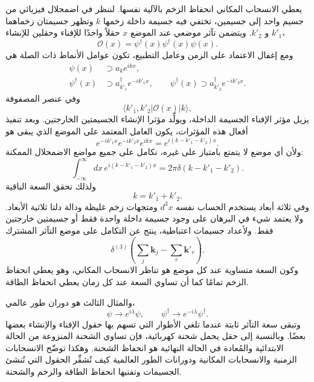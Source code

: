 يعطي الانسحاب المكاني انحفاظ الزخم بالآلية نفسها. لننظر في اضمحلال فيزيائي من جسيم واحد إلى جسيمين، تختفي فيه جسيمة داخلة زخمها \(k\) وتظهر جسيمتان زخماهما \(k'_1\) و \(k'_2\). ويتضمن تآثر موضعي عند الموضع \(x\) حقلاً واحدًا للإفناء وحقلين للإنشاء،
\begin{equation}
\mathcal{O}(x)=\psi^\dagger(x)\psi^\dagger(x)\psi(x).
\end{equation}
ومع إغفال الاعتماد على الزمن وعامل التطبيع، تكون عوامل الأنماط ذات الصلة هي
\begin{align}
\psi(x)&\supset a_k e^{ikx},
\\
\psi^\dagger(x)&\supset a_{k'_1}^\dagger e^{-ik'_1x},
\qquad
\psi^\dagger(x)\supset a_{k'_2}^\dagger e^{-ik'_2x}.
\end{align}
وفي عنصر المصفوفة
\begin{equation}
\langle k'_1,k'_2|\mathcal{O}(x)|k\rangle,
\end{equation}
يزيل مؤثر الإفناء الجسيمة الداخلة، ويولِّد مؤثرا الإنشاء الجسيمتين الخارجتين. وبعد تنفيذ أفعال هذه المؤثرات، يكون العامل المعتمد على الموضع الذي يبقى هو
\begin{equation}
e^{-ik'_1x}e^{-ik'_2x}e^{ikx}
=e^{i(k-k'_1-k'_2)x}.
\end{equation}
ولأن أي موضع لا يتمتع بامتياز على غيره، نكامل على جميع مواضع الاضمحلال الممكنة:
\begin{equation}
\int_{-\infty}^{\infty}dx\,
e^{i(k-k'_1-k'_2)x}
=2\pi\delta(k-k'_1-k'_2).
\end{equation}
ولذلك تحقق السعة الباقية
\begin{equation}
k=k'_1+k'_2.
\end{equation}
وفي ثلاثة أبعاد يستخدم الحساب نفسه \(d^3x\) ومتجهات زخم غليظة ودالة دلتا ثلاثية الأبعاد. ولا يعتمد شيء في البرهان على وجود جسيمة داخلة واحدة فقط أو جسيمتين خارجتين فقط. ولأعداد جسيمات اعتباطية، ينتج عن التكامل على موضع التآثر المشترك
\begin{equation}
\delta^{(3)}\!\left(
\sum_j\mathbf{k}_j-\sum_r\mathbf{k}'_r
\right).
\end{equation}
وكون السعة متساوية عند كل موضع هو تناظر الانسحاب المكاني، وهو يعطي انحفاظ الزخم تمامًا كما أن تساوي السعة عند كل زمان يعطي انحفاظ الطاقة.

والمثال الثالث هو دوران طور عالمي،
\begin{equation}
\psi\longrightarrow e^{i\lambda}\psi,
\qquad
\psi^\dagger\longrightarrow e^{-i\lambda}\psi^\dagger.
\end{equation}
وتبقى سعة التآثر ثابتة عندما تلغي الأطوار التي تسهم بها حقول الإفناء والإنشاء بعضها بعضًا. وبالنسبة إلى حقل يحمل شحنة كهربائية، فإن تساوي الشحنة المنزوعة من الحالة الابتدائية والمُعادة في الحالة النهائية هو انحفاظ الشحنة. وهكذا توضّح الانسحابات الزمنية والانسحابات المكانية ودورانات الطور العالمية كيف تُشفِّر الحقول التي تُنشئ الجسيمات وتفنيها انحفاظ الطاقة والزخم والشحنة.


